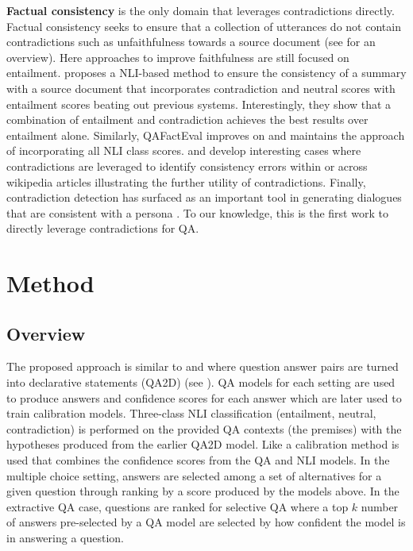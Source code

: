 \documentclass[11pt]{article}
\begin{document}
\textbf{Factual consistency} is the only domain that leverages contradictions directly. Factual consistency seeks to ensure that a collection of utterances do not contain contradictions such as unfaithfulness towards a source document (see \citet{li_faithfulness_2022} for an overview). Here approaches to improve faithfulness are still focused on entailment. \citet{laban_summac_2022} proposes a NLI-based method to ensure the consistency of a summary with a source document that incorporates contradiction and neutral scores with entailment scores beating out previous systems. Interestingly, they show that a combination of entailment and contradiction achieves the best results over entailment alone. Similarly, QAFactEval \citep{fabbri_qafacteval_2022} improves on \citet{laban_summac_2022} and maintains the approach of incorporating all NLI class scores. \citet{schuster_stretching_2022} and \citet{hsu_wikicontradiction_2021} develop interesting cases where contradictions are leveraged to identify consistency errors within or across wikipedia articles illustrating the further utility of contradictions. Finally, contradiction detection has surfaced as an important tool in generating dialogues that are consistent with a persona \citep{nie_i_2021, song_generating_2020}. To our knowledge, this is the first work to directly leverage contradictions for QA.
\section{Method}
\subsection{Overview}
The proposed approach is similar to \citet{chen_can_2021} and \citet{mishra_looking_2021} where question answer pairs are turned into declarative statements (QA2D) (see \citet{demszky_transforming_2018}). QA models for each setting are used to produce answers and confidence scores for each answer which are later used to train calibration models. Three-class NLI classification (entailment, neutral, contradiction) is performed on the provided QA contexts (the premises) with the hypotheses produced from the earlier QA2D model. Like \citet{chen_can_2021} a calibration method is used that combines the confidence scores from the QA and NLI models. In the multiple choice setting, answers are selected among a set of alternatives for a given question through ranking by a score produced by the models above. In the extractive QA case, questions are ranked for selective QA \citep{kamath_selective_2020} where a top $k$ number of answers pre-selected by a QA model are selected by how confident the model is in answering a question.
\end{document}
